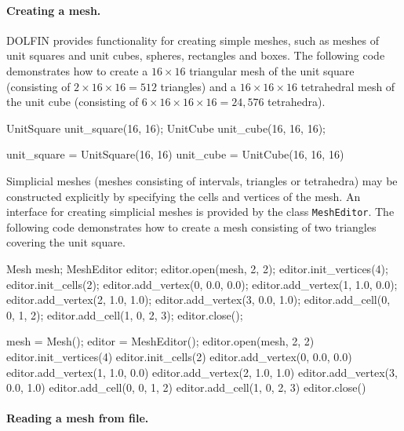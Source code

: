 \paragraph{Creating a mesh.}

DOLFIN provides functionality for creating simple meshes, such as
meshes of unit squares and unit cubes, spheres, rectangles and
boxes. The following code demonstrates how to create a $16\times 16$
triangular mesh of the unit square (consisting of $2\times 16\times 16
= 512$ triangles) and a $16\times 16\times 16$ tetrahedral mesh of the
unit cube (consisting of $6\times 16\times 16\times 16 = 24,576$
tetrahedra).

\begin{c++}
UnitSquare unit_square(16, 16);
UnitCube unit_cube(16, 16, 16);
\end{c++}

\begin{python}
unit_square = UnitSquare(16, 16)
unit_cube = UnitCube(16, 16, 16)
\end{python}

Simplicial meshes (meshes consisting of intervals, triangles or
tetrahedra) may be constructed explicitly by specifying the cells and
vertices of the mesh. An interface for creating simplicial meshes is
provided by the class \texttt{MeshEditor}. The following code
demonstrates how to create a mesh consisting of two triangles covering
the unit square.

\begin{c++}
Mesh mesh;
MeshEditor editor;
editor.open(mesh, 2, 2);
editor.init_vertices(4);
editor.init_cells(2);
editor.add_vertex(0, 0.0, 0.0);
editor.add_vertex(1, 1.0, 0.0);
editor.add_vertex(2, 1.0, 1.0);
editor.add_vertex(3, 0.0, 1.0);
editor.add_cell(0, 0, 1, 2);
editor.add_cell(1, 0, 2, 3);
editor.close();
\end{c++}

\begin{python}
mesh = Mesh();
editor = MeshEditor();
editor.open(mesh, 2, 2)
editor.init_vertices(4)
editor.init_cells(2)
editor.add_vertex(0, 0.0, 0.0)
editor.add_vertex(1, 1.0, 0.0)
editor.add_vertex(2, 1.0, 1.0)
editor.add_vertex(3, 0.0, 1.0)
editor.add_cell(0, 0, 1, 2)
editor.add_cell(1, 0, 2, 3)
editor.close()
\end{python}

\paragraph{Reading a mesh from file.}

